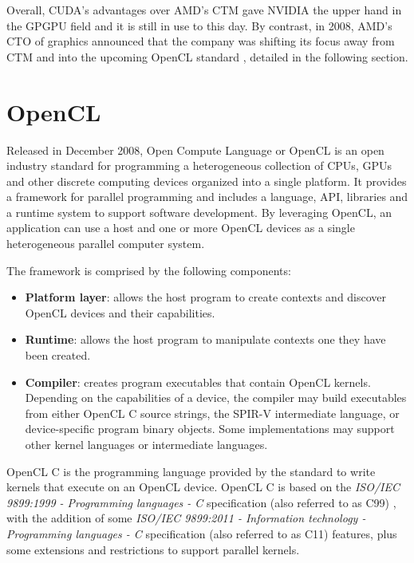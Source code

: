 Overall, CUDA's advantages over AMD's CTM gave NVIDIA the upper hand in the GPGPU field and it is still in use to this day. By contrast, in 2008, AMD's CTO of graphics announced that the company was shifting its focus away from CTM and into the upcoming OpenCL standard \cite{amd_ctm_ditch}, detailed in the following section.

\section{OpenCL}

Released in December 2008, Open Compute Language or OpenCL \cite{opencl_spec} is an open industry standard for programming a heterogeneous collection of CPUs, GPUs and other discrete computing devices organized into a single platform. It provides a framework for parallel programming and includes a language, API, libraries and a runtime system to support software development. By leveraging OpenCL, an application can use a host and one or more OpenCL devices as a single heterogeneous parallel computer system.

The framework is comprised by the following components:
\begin{itemize}
    \item \textbf{Platform layer}: allows the host program to create contexts and discover OpenCL devices and their capabilities.
    \item \textbf{Runtime}: allows the host program to manipulate contexts one they have been created.
    \item \textbf{Compiler}: creates program executables that contain OpenCL kernels. Depending on the capabilities of a device, the compiler may build executables from either OpenCL C source strings, the SPIR-V intermediate language, or device-specific program binary objects. Some implementations may support other kernel languages or intermediate languages.
\end{itemize}

OpenCL C \cite{opencl_c_spec} is the programming language provided by the standard to write kernels that execute on an OpenCL device. OpenCL C is based on the \textit{ISO/IEC 9899:1999 - Programming languages - C} specification (also referred to as C99) \cite{c99}, with the addition of some \textit{ISO/IEC 9899:2011 - Information technology - Programming languages - C} specification (also referred to as C11) \cite{c11} features, plus some extensions and restrictions to support parallel kernels.

